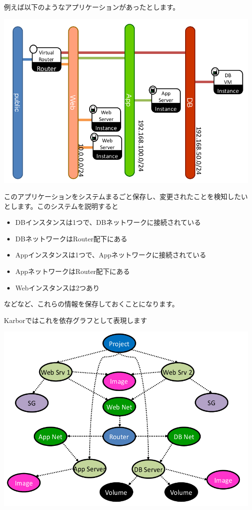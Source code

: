 \documentclass[10pt,b5paper,tombo,openany]{jsbook}
\begin{document}
例えば以下のようなアプリケーションがあったとします。

\includegraphics[width=\textwidth]{img/Smaug-sample-application.png}

このアプリケーションをシステムまるごと保存し、変更されたことを検知したいとします。このシステムを説明すると
\begin{itemize}
	\item DBインスタンスは1つで、DBネットワークに接続されている
	\item DBネットワークはRouter配下にある
	\item Appインスタンスは1つで、Appネットワークに接続されている
	\item AppネットワークはRouter配下にある
	\item Webインスタンスは2つあり
\end{itemize}
などなど、これらの情報を保存しておくことになります。

Karborではこれを依存グラフとして表現します

\includegraphics[width=\textwidth]{img/Smaug-dependency-graph.png}
\end{document}
